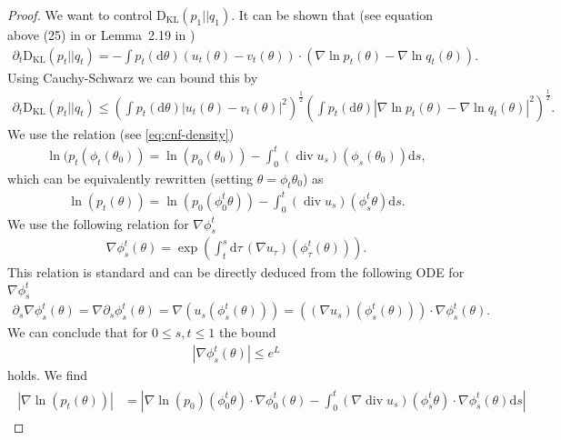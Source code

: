 \documentclass{article}
\theoremstyle{remark}
\renewcommand{\d}{\mathrm{d}}
\newcommand{\KL}{\mathrm{D_{KL}}}
\DeclareMathOperator{\Div}{div}
\begin{document}
\begin{proof}

We want to control 
$\KL(p_1||q_1)$.
It can be shown that (see equation above (25) in \cite{song2021maximum}
or Lemma~2.19 in \cite{albergo2023stochastic}
)
\begin{align}
    \partial_t \KL(p_t||q_t)
    =
    -\int p_t(\d \theta)
    (u_t(\theta)-v_t(\theta))
  \cdot  (\nabla \ln p_t(\theta)-
    \nabla \ln q_t(\theta)).
\end{align}
Using Cauchy-Schwarz we can bound this by
\begin{align}\label{eq:partial_KL}
      \partial_t \KL(p_t||q_t)
      \leq
      \left(\int p_t(\d \theta)
    |u_t(\theta)-v_t(\theta)|^2\right)^{\frac12}
    \left(
\int p_t(\d \theta)
    |\nabla \ln p_t(\theta)-
    \nabla \ln q_t(\theta)|^2
    \right)^{\frac12}.
\end{align}
We use the relation (see \eqref{eq:cnf-density})
\begin{align}
    \ln (p_t(\phi_t(\theta_0))
    =
    \ln(p_0(\theta_0))  - \int_0^t (\Div u_s)(\phi_s(\theta_0)) \d s,
\end{align}
which can be equivalently rewritten (setting $\theta=\phi_t \theta_0$) as
\begin{align}
    \ln(p_t(\theta)) =
     \ln(p_0(\phi^t_0\theta))  - \int_0^t (\Div u_s)(\phi_s^t\theta) \d s.
\end{align}
We use the following relation for $\nabla \phi_s^t$
\begin{align}
    \nabla \phi_s^t(\theta) =
    \exp\left(\int_t^s\d \tau\, (\nabla  u_\tau)(\phi^t_\tau(\theta))\right).
\end{align}
This relation is standard and can be directly deduced from the following ODE for $\nabla  \phi_s^t$
\begin{align}
    \partial_s  \nabla \phi_s^t(\theta)
    =
    \nabla  \partial_s\phi_s^t(\theta)
    =
    \nabla  (u_s(\phi_s^t(\theta)))
    = \left((\nabla u_s)(\phi_s^t(\theta))\right) \cdot \nabla  \phi_s^t(\theta).
\end{align}
We can conclude that for $0\leq s,t\leq 1$ the bound
\begin{align}\label{eq:bound_D_flow}
    | \nabla \phi_s^t(\theta)|\leq e^L
\end{align}
holds.
We find 
\begin{align}
\begin{split}\label{eq:bound_score}
   | \nabla \ln(p_t(\theta))| &=
     \left| \nabla  \ln(p_0)(\phi^t_0\theta)\cdot \nabla  \phi^t_0(\theta) - \int_0^t (\nabla  \Div u_s)(\phi_s^t\theta)\cdot \nabla \phi^t_s (\theta)\d s\right|

\end{split}
\end{align}
\end{proof}
\end{document}
